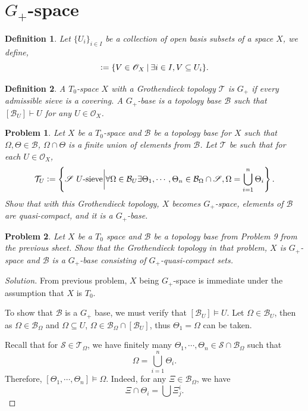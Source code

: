 \documentclass[8pt]{article}
\numberwithin{equation}{section}
\newenvironment{solution}{\begin{proof}[Solution]}{\end{proof}}
\newtheorem{definition}{Definition}[section]
\newtheorem{problem}{Problem}[section]
\newcommand{\defeq}{\vcentcolon=}
\newcommand{\Ouv}{\mathscr{O}}
\newcommand{\sep}[0]{\:|\:}
\newcommand{\sS}[0]{\mathscr{S}}
\newcommand{\cB}[0]{\mathcal{B}}
\newcommand{\cT}[0]{\mathcal{T}}
\begin{document}
\section{$G_+$-space}
\begin{definition}
  Let $\{U_i\}_{i\in I}$ be a collection of open basis subsets of a space $X$, we define,
  \begin{equation*}
    [\{U_i\}_{i\in I}]\defeq \{V\in\Ouv_X\sep \exists i\in I, V\subseteq U_i\}.
  \end{equation*}
\end{definition}
\begin{definition}
  A $T_0$-space $X$ with a Grothendieck topology $\cT$ is $G_+$ if every admissible sieve is a covering. A $G_+$-base is a topology base $\cB$ such that $[\cB_U]\vdash U$ for any $U\in\Ouv_X$.
\end{definition}
\begin{problem}
  Let $X$ be a $T_0$-space and $\cB$ be a topology base for $X$ such that $\Omega,\Theta\in\cB$, $\Omega\cap\Theta$ is a finite union of elements from $\cB$. Let $\mathcal{T}$ be such that for each $U\in\Ouv_X$,
  \begin{equation*}
    \cT_U\defeq\left\{\sS\text{ $U$-sieve}\bigg{|} \forall \Omega\in\cB_U\exists \Theta_1,\cdots,\Theta_n\in\cB_\Omega\cap\sS, \Omega = \bigcup_{i=1}^n \Theta_i\right\}.
  \end{equation*}
  Show that with this Grothendieck topology, $X$ becomes $G_+$-space, elements of $\cB$ are quasi-compact, and it is a $G_+$-base.
\end{problem}
\begin{problem}
  Let $X$ be a $T_0$ space and $\cB$ be a topology base from Problem 9 from the previous sheet. Show that the Grothendieck topology in that problem, $X$ is $G_+$-space and $\cB$ is a $G_+$-base consisting of $G_+$-quasi-compact sets.
\end{problem}
\begin{solution}
  From previous problem, $X$ being $G_+$-space is immediate under the assumption that $X$ is $T_0$.
  \par To show that $\cB$ is a $G_+$ base, we must verify that $[\cB_U]\vDash U$. Let $\Omega\in\cB_U$, then as $\Omega\in\cB_\Omega$ and $\Omega\subseteq U$, $\Omega\in\cB_\Omega\cap[\cB_U]$, thus $\Theta_1= \Omega$ can be taken.
  \par Recall that for $\sS\in\cT_\Omega$, we have finitely many $\Theta_1,\cdots,\Theta_n\in\sS\cap\cB_\Omega$ such that 
  \begin{equation*}
    \Omega = \bigcup_{i=1}^n\Theta_i.
  \end{equation*}
  Therefore, $[\Theta_1,\cdots,\Theta_n]\vDash \Omega$. Indeed, for any $\Xi\in\cB_\Omega$, we have 
  \begin{equation*}
    \Xi\cap\Theta_i = \bigcup\Xi_j^i.
  \end{equation*}
\end{solution}
\end{document}

